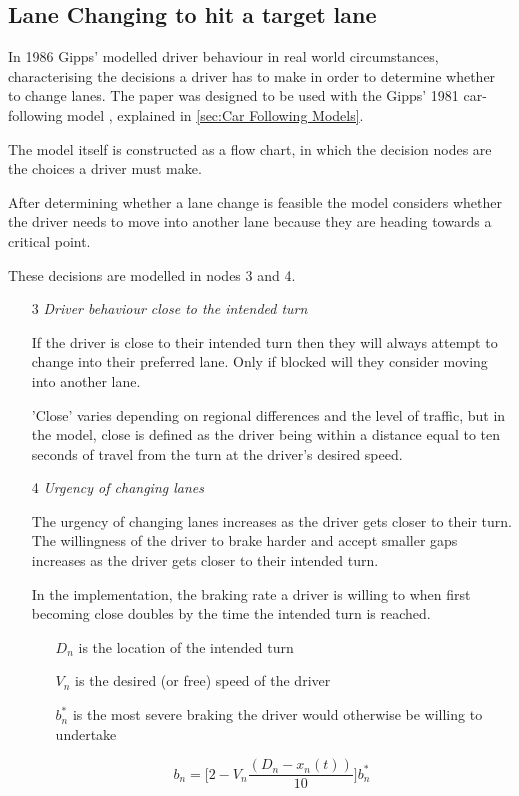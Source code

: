 \subsection{Lane Changing to hit a target lane}
\label{subsec:Lane Changing to hit a target lane}
In 1986 Gipps' modelled driver behaviour in real world circumstances, characterising the decisions a driver has to make in order to determine whether to change lanes. The paper was designed to be used with the Gipps' 1981 car-following model \citep{Gipps1981}, explained in \ref{sec:Car Following Models}.

The model itself is constructed as a flow chart, in which the decision nodes are the choices a driver must make. 


After determining whether a lane change is feasible the model considers whether the driver needs to move into another lane because they are heading towards a critical point.

These decisions are modelled in nodes 3 and 4.

\begin{enumerate}
\item[3] \textit{Driver behaviour close to the intended turn}

If the driver is close to their intended turn then they will always attempt to change into their preferred lane. Only if blocked will they consider moving into another lane. 

'Close' varies depending on regional differences and the level of traffic, but in the model, close is defined as the driver being within a distance equal to ten seconds of travel from the turn at the driver's desired speed.

\item[4] \textit{Urgency of changing lanes}

The urgency of changing lanes increases as the driver gets closer to their turn. The willingness of the driver to brake harder and accept smaller gaps increases as the driver gets closer to their intended turn.

In the implementation, the braking rate a driver is willing to when first becoming close doubles by the time the intended turn is reached. 

\begin{itemize}
\item[$D_n$] is the location of the intended turn
\item[$V_n$] is the desired (or free) speed of the driver
\item[$b_n^*$] is the most severe braking the driver would otherwise be willing to undertake
\end{itemize}

\begin{equation}
b_n = \Biggl[2 - V_n\frac{(D_n - x_n(t))}{10}\Biggr]b_n^*
\end{equation}

\end{enumerate}

